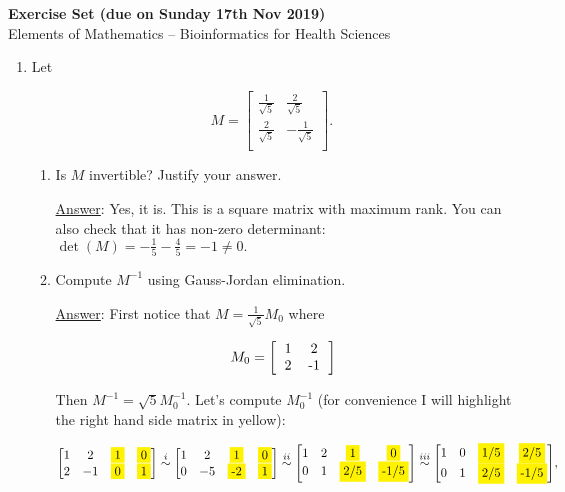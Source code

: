 \documentclass[]{book}
\theoremstyle{definition}
\newcommand\yellow[1]{\colorbox{yellow}{#1}}
\newcommand\ans{\underline{Answer}: }
\begin{document}
\begin{center}
\textbf{Exercise Set (due on Sunday 17th Nov 2019)}\\ %
Elements of Mathematics -- Bioinformatics for Health Sciences \\
\end{center}

\vspace{0.2 cm}

\begin{enumerate}



\item Let

\[
   M=
  \left[ {\begin{array}{cc}
   \frac{1}{\sqrt{5}} & \frac{2}{\sqrt{5}} \\
   \frac{2}{\sqrt{5}} & -\frac{1}{\sqrt{5}} \\
  \end{array} } \right].
\]

\begin{enumerate}
\item Is $M$ invertible? Justify your answer.

\ans  Yes, it is. This is a square matrix with maximum rank. You can also check that it has non-zero determinant:
$\det(M) = -\frac{1}{5} - \frac{4}{5} = -1 \neq 0.$

\item Compute $M^{-1}$ using Gauss-Jordan elimination.

\ans First notice that $M = \frac{1}{\sqrt{5}} M_0$ where

$$
M_0 =
\left[ 
{\begin{tabular}{cc}
  1 & 2  \\
  2 & -1 \\
  \end{tabular} }
\right]
$$

Then $M^{-1} = \sqrt{5} M_0^{-1}$. Let's compute $M_0^{-1}$ (for convenience I will highlight the right hand side matrix in yellow):

\[
{\begin{bmatrix}
  1 & 2  & \yellow{1} & \yellow{0} \\
  2 & -1  &\yellow{0} & \yellow{1}
  \end{bmatrix}
}
\stackrel{i}{\sim}
{\begin{bmatrix}
  1 & 2  & \yellow{1} & \yellow{0} \\
  0 & -5  & \yellow{-2} & \yellow{1}
  \end{bmatrix}
}
\stackrel{ii}{\sim}
{\begin{bmatrix}
  1 & 2  & \yellow{1} & \yellow{0} \\
  0 & 1  & \yellow{2/5} & \yellow{-1/5}
  \end{bmatrix}
}
\stackrel{iii}{\sim}
{\begin{bmatrix}
  1 & 0  & \yellow{1/5} & \yellow{2/5} \\
  0 & 1  & \yellow{2/5} & \yellow{-1/5}
  \end{bmatrix}
},
\]


\end{enumerate}
\end{enumerate}
\end{document}
